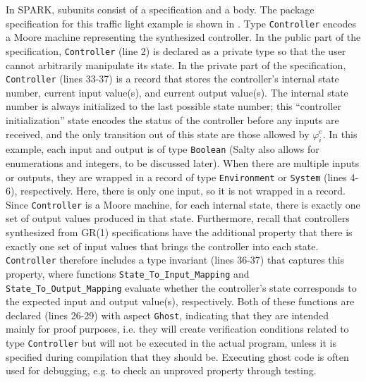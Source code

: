 \documentclass[runningheads]{llncs}
\begin{document}
In SPARK, subunits consist of a specification and a body.
The package specification for this traffic light example is shown in .
Type \lstinline{Controller} encodes a Moore machine representing the synthesized controller. 
In the public part of the specification, \lstinline{Controller} (line 2) is declared as a private type so that the user cannot arbitrarily manipulate its state.  
In the private part of the specification, \lstinline{Controller} (lines 33-37) is a record that stores the controller's internal state number, 
current input value(s), and current output value(s). 
The internal state number is always initialized to the last possible state number; 
this ``controller initialization'' state encodes the status of the controller before any inputs are received, and the only transition out of this state are those allowed by $\varphi_i^e$.
In this example, each input and output is of type \lstinline{Boolean} (Salty also allows for enumerations and integers, to be discussed later). 
When there are multiple inputs or outputs, they are wrapped in a record of type \lstinline{Environment} or \lstinline{System} (lines 4-6), respectively. 
Here, there is only one input, so it is not wrapped in a record. 
Since \lstinline{Controller} is a Moore machine, for each internal state, 
there is exactly one set of output values produced in that state. 
Furthermore, recall that controllers synthesized from GR(1) specifications have the additional property that 
there is exactly one set of input values that brings the controller into each state. 
\lstinline{Controller} therefore includes a type invariant (lines 36-37) that captures this property, 
where functions \lstinline{State_To_Input_Mapping} and \lstinline{State_To_Output_Mapping} evaluate 
whether the controller's state corresponds to the expected input and output value(s), respectively. 
Both of these functions are declared (lines 26-29) with aspect \lstinline{Ghost}, indicating that they are intended mainly for proof purposes, 
i.e. they will create verification conditions related to type \lstinline{Controller} but will not be executed in the actual program, 
unless it is specified during compilation that they should be.
Executing ghost code is often used for debugging, e.g. to check an unproved property through testing. 
\end{document}
